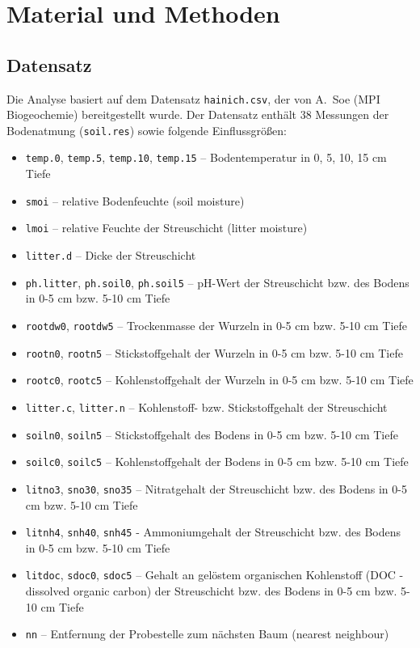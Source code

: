 \section{Material und Methoden}

\subsection{Datensatz}

Die Analyse basiert auf dem Datensatz \texttt{hainich.csv}, der von A.~Soe (MPI Biogeochemie)
bereitgestellt wurde. Der Datensatz enthält 38 Messungen der Bodenatmung (\texttt{soil.res}) sowie
folgende Einflussgrößen:

\begin{itemize}
\setlength{\itemsep}{0pt}
\item \texttt{temp.0}, \texttt{temp.5}, \texttt{temp.10}, \texttt{temp.15} – Bodentemperatur in 0, 5, 10, 15 cm Tiefe
\item \texttt{smoi} – relative Bodenfeuchte (soil moisture)
\item \texttt{lmoi} – relative Feuchte der Streuschicht (litter moisture)
\item \texttt{litter.d} – Dicke der Streuschicht
\item \texttt{ph.litter}, \texttt{ph.soil0}, \texttt{ph.soil5} – pH-Wert der Streuschicht bzw. des Bodens in 0-5 cm bzw. 5-10 cm Tiefe
\item \texttt{rootdw0}, \texttt{rootdw5} – Trockenmasse der Wurzeln in 0-5 cm bzw. 5-10 cm Tiefe
\item \texttt{rootn0}, \texttt{rootn5} – Stickstoffgehalt der Wurzeln in 0-5 cm bzw. 5-10 cm Tiefe
\item \texttt{rootc0}, \texttt{rootc5} – Kohlenstoffgehalt der Wurzeln in 0-5 cm bzw. 5-10 cm Tiefe
\item \texttt{litter.c}, \texttt{litter.n} – Kohlenstoff- bzw. Stickstoffgehalt der Streuschicht
\item \texttt{soiln0}, \texttt{soiln5} – Stickstoffgehalt des Bodens in 0-5 cm bzw. 5-10 cm Tiefe
\item \texttt{soilc0}, \texttt{soilc5} – Kohlenstoffgehalt der Bodens in 0-5 cm bzw. 5-10 cm Tiefe
\item \texttt{litno3}, \texttt{sno30}, \texttt{sno35} – Nitratgehalt der Streuschicht bzw. des Bodens in 0-5 cm bzw. 5-10 cm Tiefe
\item \texttt{litnh4}, \texttt{snh40}, \texttt{snh45} - Ammoniumgehalt der Streuschicht bzw. des Bodens in 0-5 cm bzw. 5-10 cm Tiefe
\item \texttt{litdoc}, \texttt{sdoc0}, \texttt{sdoc5} – Gehalt an gelöstem organischen Kohlenstoff (DOC - dissolved organic carbon) der Streuschicht bzw. des Bodens in 0-5 cm bzw. 5-10 cm Tiefe
\item \texttt{nn} – Entfernung der Probestelle zum nächsten Baum (nearest neighbour)
\end{itemize}

